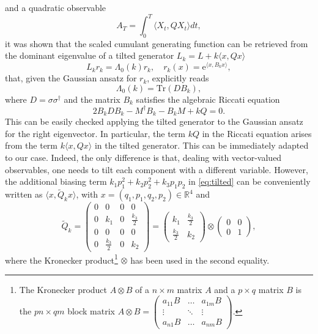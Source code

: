 \documentclass[a4paper,11pt]{article}
\numberwithin{equation}{section}
\begin{document}
and a quadratic observable $$A_T = \int_0^T \langle X_t, Q X_t \rangle dt,$$ it was shown that the scaled cumulant generating function can be retrieved from the dominant eigenvalue of a tilted generator $L_k = L + k \langle x, Q x \rangle$
\begin{equation}
    L_k r_k = \Lambda_0(k) r_k, \quad r_k (x)  = \mathrm{e}^{\langle x, B_k x \rangle},
\end{equation}
that, given the Gaussian ansatz for $r_k$, explicitly reads
\begin{equation}
    \Lambda_0(k)= \mathrm{Tr}(D B_k) ,
\end{equation}
where $D=\sigma \sigma^{\dag}$ and the matrix $B_k$ satisfies the algebraic Riccati equation
\begin{equation}\label{eq:RicPRE}
    2 B_k D B_k - M^\dag B_k - B_k M + kQ =0.
\end{equation}
This can be easily checked applying the tilted generator to the  Gaussian ansatz for the right eigenvector. In particular, the term $kQ$ in the Riccati equation arises from the term $k\langle x, Q x \rangle$ in the tilted generator.
This can be immediately adapted to our case. Indeed, the only difference is that, dealing with vector-valued observables, one needs to tilt each component with a different variable. However, the additional biasing term $k_1 p_1^2 + k_2 p_2^2 + k_3 p_1 p_2$ in \eqref{eq:tilted} can be conveniently written as $\langle x, \widetilde{Q}_k x \rangle$, with $x=(q_1,p_1,q_2,p_2)\in \mathbb{R}^4$ and 
\begin{equation}
    \widetilde{Q}_k = 
    \begin{pmatrix}
       0 & 0 & 0 & 0 \\
       0 & k_1 &0 &\frac{k_3}{2} \\
       0 &0 & 0 & 0 \\
       0 &\frac{k_3}{2} & 0 & k_2
    \end{pmatrix} = \begin{pmatrix}
        k_1 & \frac{k_3}{2} \\
        \frac{k_3}{2} & k_2
    \end{pmatrix}
    \otimes
    \begin{pmatrix}
        0 & 0 \\
        0 & 1
    \end{pmatrix} ,
\end{equation}
where the Kronecker product\footnote{The Kronecker product $A \otimes B$ of a $n\times m$ matrix $A$ and a $p \times q$ matrix $B$ is the $pn \times qm$ block matrix $A \otimes B = 
\begin{pmatrix}
 a_{11} B & \ldots & a_{1m} B  \\
 \vdots & \ddots & \vdots \\
 a_{n1} B & \ldots & a_{nm} B
\end{pmatrix}.$} $\otimes$ has been used in the second equality.
\end{document}
